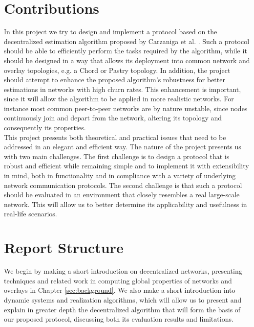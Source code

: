 \documentclass[a4paper,11pt,twoside]{report}
\begin{document}
\section{Contributions}

In this project we try to design and implement a protocol based on the decentralized estimation algorithm proposed by Carzaniga et al. \cite{6195806}. Such a protocol should be able to efficiently perform the tasks required by the algorithm, while it should be designed in a way that allows its deployment into common network and overlay topologies, e.g. a Chord or Pastry topology. In addition, the project should attempt to enhance the proposed algorithm's robustness for better estimations in networks with high churn rates. This enhancement is important, since it will allow the algorithm to be applied in more realistic networks. For instance most common peer-to-peer networks are by nature unstable, since nodes continuously join and depart from the network, altering its topology and consequently its properties.\\

This project presents both theoretical and practical issues that need to be addressed in an elegant and efficient way. The nature of the project presents us with two main challenges. The first challenge is to design a protocol that is robust and efficient while remaining simple and to implement it with extensibility in mind, both in functionality and in compliance with a variety of underlying network communication protocols. The second challenge is that such a protocol should be evaluated in an environment that closely resembles a real large-scale network. This will allow us to better determine its applicability and usefulness in real-life scenarios. 


\section{Report Structure}

We begin by making a short introduction on decentralized networks, presenting techniques and related work in computing global properties of networks and overlays in Chapter \ref{sec:background}. We also make a short introduction into dynamic systems and realization algorithms, which will allow us to present and explain in greater depth the decentralized algorithm that will form the basis of our proposed protocol, discussing both its evaluation results and limitations.\\
\end{document}
